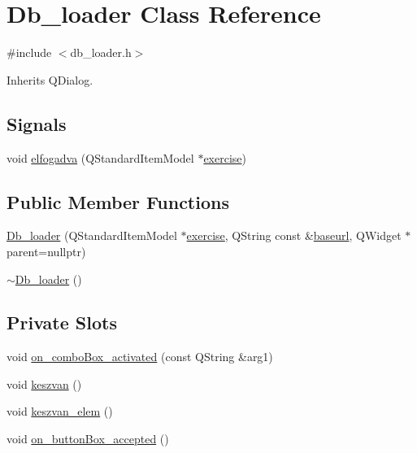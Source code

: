 \hypertarget{classDb__loader}{}\section{Db\+\_\+loader Class Reference}
\label{classDb__loader}


{\ttfamily \#include $<$db\+\_\+loader.\+h$>$}



Inherits Q\+Dialog.

\subsection*{Signals}
\begin{DoxyCompactItemize}
\item 
void \hyperlink{classDb__loader_ac2b4287582e909c978a7ef903080a791}{elfogadva} (Q\+Standard\+Item\+Model $\ast$\hyperlink{classDb__loader_ae2bf960f9be242be7b72496bd28fb2b3}{exercise})
\end{DoxyCompactItemize}
\subsection*{Public Member Functions}
\begin{DoxyCompactItemize}
\item 
\hyperlink{classDb__loader_a3a0062be83bea07369d7b6ab0fc77444}{Db\+\_\+loader} (Q\+Standard\+Item\+Model $\ast$\hyperlink{classDb__loader_ae2bf960f9be242be7b72496bd28fb2b3}{exercise}, Q\+String const \&\hyperlink{classDb__loader_a2f830277361852656d3883ed25a9637d}{baseurl}, Q\+Widget $\ast$parent=nullptr)
\item 
\hyperlink{classDb__loader_a4e14668e7c5243ad9369914343201003}{$\sim$\+Db\+\_\+loader} ()
\end{DoxyCompactItemize}
\subsection*{Private Slots}
\begin{DoxyCompactItemize}
\item 
void \hyperlink{classDb__loader_af4abb62f67a8c249ddd84a78966acd8b}{on\+\_\+combo\+Box\+\_\+activated} (const Q\+String \&arg1)
\item 
void \hyperlink{classDb__loader_a3d308bb09c20a83faa4da10aae8bca27}{keszvan} ()
\item 
void \hyperlink{classDb__loader_a089a424b1719bfbf4068b10bd1070614}{keszvan\+\_\+elem} ()
\item 
void \hyperlink{classDb__loader_a29a8fa0c0dbc868c7ef0836b27d078f3}{on\+\_\+button\+Box\+\_\+accepted} ()
\end{DoxyCompactItemize}
